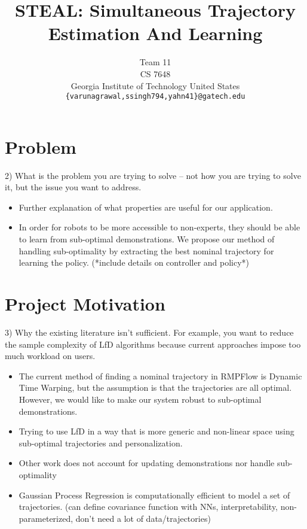 \documentclass{article}
\title{STEAL: Simultaneous Trajectory Estimation And Learning}
\author{
  Team 11\\
  CS 7648\\
  Georgia Institute of Technology
  United States\\
  \texttt{\{varunagrawal,ssingh794,yahn41\}@gatech.edu} \\
}
\begin{document}
\maketitle

\vspace{-3.5em}
\section{Problem}

2) What is the problem you are trying to solve -- not how you are trying to solve it, but the issue you want to address. 

\begin{itemize}
    \item Further explanation of what properties are useful for our application.
    \item In order for robots to be more accessible to non-experts, they should be able to learn from sub-optimal demonstrations. We propose our method of handling sub-optimality by extracting the best nominal trajectory for learning the policy. (*include details on controller and policy*)

\end{itemize} 

\vspace{-1em}
\section{Project Motivation}

3) Why the existing literature isn't sufficient. For example, you want to reduce the sample complexity of LfD algorithms because current approaches impose too much workload on users.

\begin{itemize}
    \item  The current method of finding a nominal trajectory in RMPFlow is Dynamic Time Warping, but the assumption is that the trajectories are all optimal. However, we would like to make our system robust to sub-optimal demonstrations.
    \item Trying to use LfD in a way that is more generic and non-linear space using sub-optimal trajectories and personalization.
    \item Other work does not account for updating demonstrations nor handle sub-optimality
    \item Gaussian Process Regression is computationally efficient to model a set of trajectories. (can define covariance function with NNs, interpretability, non-parameterized, don't need a lot of data/trajectories)
    
\end{itemize}
\end{document}
